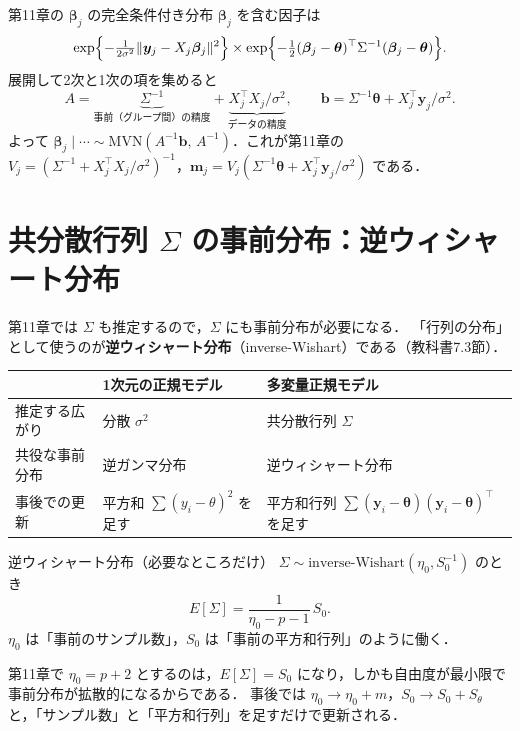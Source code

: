 \documentclass[lualatex,ja=standard,a4paper,12pt]{bxjsarticle}
\newcommand{\mvn}{\mathrm{MVN}}
\begin{document}
\begin{exbox}{第11章の $\bm{\beta}_j$ の完全条件付き分布}
$\bm{\beta}_j$ を含む因子は
\[
  \exp\Bigl\{-\tfrac{1}{2\sigma^2}\|\bm{y}_j - X_j\bm{\beta}_j\|^2\Bigr\}
  \times \exp\Bigl\{-\tfrac12(\bm{\beta}_j - \bm{\theta})^\top\Sigma^{-1}(\bm{\beta}_j - \bm{\theta})\Bigr\}.
\]
展開して2次と1次の項を集めると
\[
  A = \underbrace{\Sigma^{-1}}_{\text{事前（グループ間）の精度}} + \underbrace{X_j^\top X_j/\sigma^2}_{\text{データの精度}},
  \qquad
  \bm{b} = \Sigma^{-1}\bm{\theta} + X_j^\top\bm{y}_j/\sigma^2.
\]
よって $\bm{\beta}_j \mid \cdots \sim \mvn(A^{-1}\bm{b},\, A^{-1})$．これが第11章の
$V_j = (\Sigma^{-1} + X_j^\top X_j/\sigma^2)^{-1}$，$\bm{m}_j = V_j(\Sigma^{-1}\bm{\theta} + X_j^\top\bm{y}_j/\sigma^2)$ である．
\end{exbox}

\section{共分散行列 $\Sigma$ の事前分布：逆ウィシャート分布}

第11章では $\Sigma$ も推定するので，$\Sigma$ にも事前分布が必要になる．
「行列の分布」として使うのが\textbf{逆ウィシャート分布}（inverse-Wishart）である（教科書7.3節）．

\begin{center}
\renewcommand{\arraystretch}{1.5}
\begin{tabular}{lll}
\toprule
 & 1次元の正規モデル & 多変量正規モデル \\
\midrule
推定する広がり & 分散 $\sigma^2$ & 共分散行列 $\Sigma$ \\
共役な事前分布 & 逆ガンマ分布 & 逆ウィシャート分布 \\
事後での更新 & 平方和 $\sum(y_i - \theta)^2$ を足す & 平方和行列 $\sum(\bm{y}_i - \bm{\theta})(\bm{y}_i - \bm{\theta})^\top$ を足す \\
\bottomrule
\end{tabular}
\end{center}

\begin{defbox}{逆ウィシャート分布（必要なところだけ）}
$\Sigma \sim \mathrm{inverse\text{-}Wishart}(\eta_0, S_0^{-1})$ のとき
\[
  E[\Sigma] = \frac{1}{\eta_0 - p - 1}\,S_0.
\]
$\eta_0$ は「事前のサンプル数」，$S_0$ は「事前の平方和行列」のように働く．
\end{defbox}

\noindent 第11章で $\eta_0 = p + 2$ とするのは，$E[\Sigma] = S_0$ になり，しかも自由度が最小限で事前分布が拡散的になるからである．
事後では $\eta_0 \to \eta_0 + m$，$S_0 \to S_0 + S_\theta$ と，「サンプル数」と「平方和行列」を足すだけで更新される．
\end{document}
